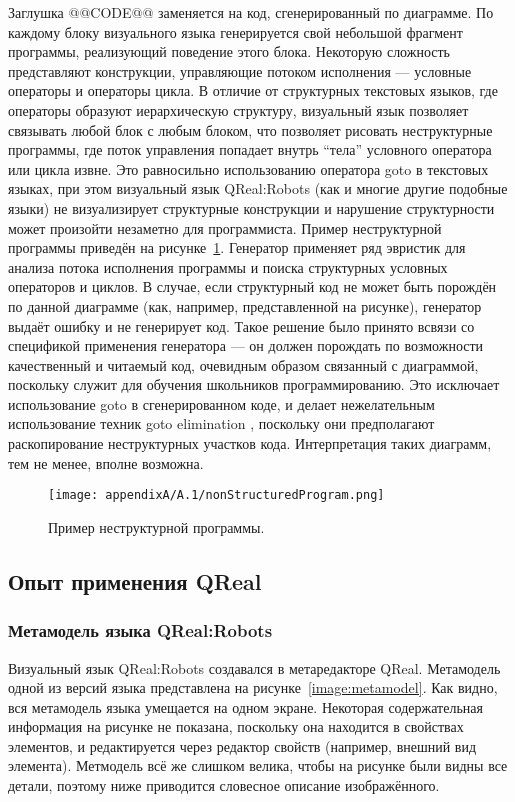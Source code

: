 Заглушка @@CODE@@ заменяется на код, сгенерированный по диаграмме. По каждому блоку 
визуального языка генерируется свой небольшой фрагмент программы, реализующий поведение 
этого блока. Некоторую сложность представляют конструкции, управляющие потоком исполнения 
--- условные операторы и операторы цикла. В отличие от структурных текстовых языков, 
где операторы образуют иерархическую структуру, визуальный язык позволяет связывать 
любой блок с любым блоком, что позволяет рисовать неструктурные программы, где поток 
управления попадает внутрь "`тела"' условного оператора или цикла извне. Это равносильно 
использованию оператора goto в текстовых языках, при этом визуальный язык QReal:Robots 
(как и многие другие подобные языки) не визуализирует структурные конструкции и нарушение 
структурности может произойти незаметно для программиста. Пример неструктурной программы 
приведён на рисунке~\ref{image:nonStructuredProgram}. Генератор применяет ряд эвристик 
для анализа потока исполнения программы и поиска структурных условных операторов и 
циклов. В случае, если структурный код не может быть порождён по данной диаграмме 
(как, например, представленной на рисунке), генератор выдаёт ошибку и не генерирует 
код. Такое решение было принято всвязи со спецификой применения генератора --- он 
должен порождать по возможности качественный и читаемый код, очевидным образом связанный 
с диаграммой, поскольку служит для обучения школьников программированию. Это исключает
использование goto в сгенерированном коде, и делает нежелательным использование техник goto elimination%
, поскольку они предполагают раскопирование неструктурных участков кода. Интерпретация 
таких диаграмм, тем не менее, вполне возможна.

\begin{figure} [ht]
	\begin{center}
		\texttt{[image: appendixA/A.1/nonStructuredProgram.png]}
		\caption{Пример неструктурной программы.}
		\label{image:nonStructuredProgram}
	\end{center}
\end{figure}

\subsection{Опыт применения QReal}
\subsubsection{Метамодель языка QReal:Robots}
Визуальный язык QReal:Robots создавался в метаредакторе QReal. Метамодель одной из 
версий языка представлена на рисунке~\ref{image:metamodel}. Как видно, вся метамодель 
языка умещается на одном экране. Некоторая содержательная информация на рисунке не 
показана, поскольку она находится в свойствах элементов, и редактируется через редактор 
свойств (например, внешний вид элемента). Метмодель всё же слишком велика, чтобы на 
рисунке были видны все детали, поэтому ниже приводится словесное описание изображённого.

